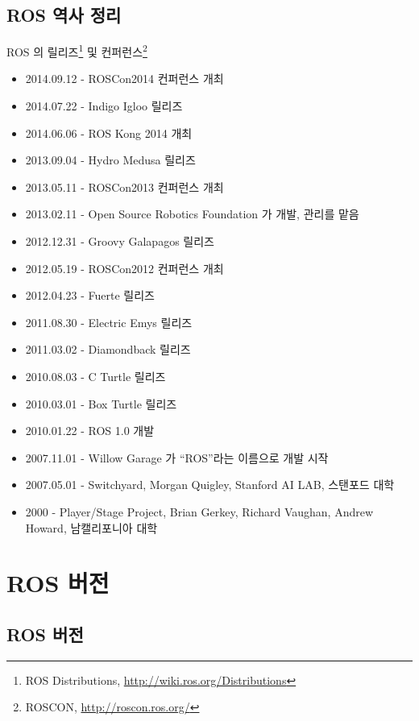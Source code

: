 \subsection{ROS 역사 정리}

ROS 의 릴리즈\footnote{ROS Distributions, \url{http://wiki.ros.org/Distributions}} 및 컨퍼런스\footnote{ROSCON, \url{http://roscon.ros.org/}}

\begin{itemize}[leftmargin=*]
\item 2014.09.12 - ROSCon2014 컨퍼런스 개최
\item 2014.07.22 - Indigo Igloo 릴리즈
\item 2014.06.06 - ROS Kong 2014 개최
\item 2013.09.04 - Hydro Medusa 릴리즈
\item 2013.05.11 - ROSCon2013 컨퍼런스 개최
\item 2013.02.11 - Open Source Robotics Foundation 가 개발, 관리를 맡음
\item 2012.12.31 - Groovy Galapagos 릴리즈
\item 2012.05.19 - ROSCon2012 컨퍼런스 개최
\item 2012.04.23 - Fuerte 릴리즈
\item 2011.08.30 - Electric Emys 릴리즈
\item 2011.03.02 - Diamondback 릴리즈
\item 2010.08.03 - C Turtle 릴리즈
\item 2010.03.01 - Box Turtle 릴리즈
\item 2010.01.22 - ROS 1.0 개발
\item 2007.11.01 - Willow Garage 가 “ROS”라는 이름으로 개발 시작
\item 2007.05.01 - Switchyard, Morgan Quigley, Stanford AI LAB, 스탠포드 대학
\item 2000 - Player/Stage Project, Brian Gerkey, Richard Vaughan, Andrew Howard, 남캘리포니아 대학
\end{itemize}


\section{ROS 버전}

\subsection{ROS 버전}

